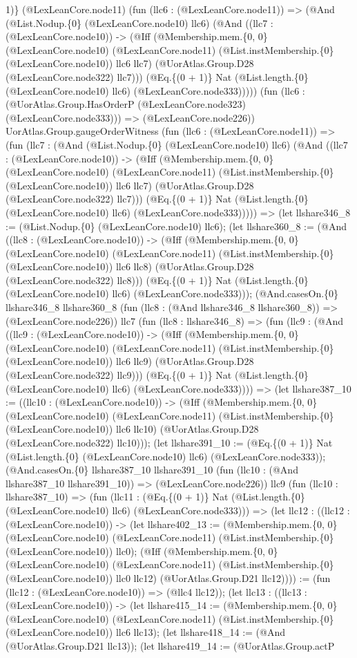 \documentclass[11pt]{article}
\begin{document}
1)\} (@LexLeanCore.node11) (fun (llc6 : (@LexLeanCore.node11)) => (@And (@List.Nodup.\{0\} (@LexLeanCore.node10) llc6) (@And ((llc7 : (@LexLeanCore.node10)) -> (@Iff (@Membership.mem.\{0, 0\} (@LexLeanCore.node10) (@LexLeanCore.node11) (@List.instMembership.\{0\} (@LexLeanCore.node10)) llc6 llc7) (@UorAtlas.Group.D28 (@LexLeanCore.node322) llc7))) (@Eq.\{(0 + 1)\} Nat (@List.length.\{0\} (@LexLeanCore.node10) llc6) (@LexLeanCore.node333))))) (fun (llc6 : (@UorAtlas.Group.HasOrderP (@LexLeanCore.node323) (@LexLeanCore.node333))) => (@LexLeanCore.node226)) UorAtlas.Group.gaugeOrderWitness (fun (llc6 : (@LexLeanCore.node11)) => (fun (llc7 : (@And (@List.Nodup.\{0\} (@LexLeanCore.node10) llc6) (@And ((llc7 : (@LexLeanCore.node10)) -> (@Iff (@Membership.mem.\{0, 0\} (@LexLeanCore.node10) (@LexLeanCore.node11) (@List.instMembership.\{0\} (@LexLeanCore.node10)) llc6 llc7) (@UorAtlas.Group.D28 (@LexLeanCore.node322) llc7))) (@Eq.\{(0 + 1)\} Nat (@List.length.\{0\} (@LexLeanCore.node10) llc6) (@LexLeanCore.node333))))) => (let llshare346\_8 := (@List.Nodup.\{0\} (@LexLeanCore.node10) llc6); (let llshare360\_8 := (@And ((llc8 : (@LexLeanCore.node10)) -> (@Iff (@Membership.mem.\{0, 0\} (@LexLeanCore.node10) (@LexLeanCore.node11) (@List.instMembership.\{0\} (@LexLeanCore.node10)) llc6 llc8) (@UorAtlas.Group.D28 (@LexLeanCore.node322) llc8))) (@Eq.\{(0 + 1)\} Nat (@List.length.\{0\} (@LexLeanCore.node10) llc6) (@LexLeanCore.node333))); (@And.casesOn.\{0\} llshare346\_8 llshare360\_8 (fun (llc8 : (@And llshare346\_8 llshare360\_8)) => (@LexLeanCore.node226)) llc7 (fun (llc8 : llshare346\_8) => (fun (llc9 : (@And ((llc9 : (@LexLeanCore.node10)) -> (@Iff (@Membership.mem.\{0, 0\} (@LexLeanCore.node10) (@LexLeanCore.node11) (@List.instMembership.\{0\} (@LexLeanCore.node10)) llc6 llc9) (@UorAtlas.Group.D28 (@LexLeanCore.node322) llc9))) (@Eq.\{(0 + 1)\} Nat (@List.length.\{0\} (@LexLeanCore.node10) llc6) (@LexLeanCore.node333)))) => (let llshare387\_10 := ((llc10 : (@LexLeanCore.node10)) -> (@Iff (@Membership.mem.\{0, 0\} (@LexLeanCore.node10) (@LexLeanCore.node11) (@List.instMembership.\{0\} (@LexLeanCore.node10)) llc6 llc10) (@UorAtlas.Group.D28 (@LexLeanCore.node322) llc10))); (let llshare391\_10 := (@Eq.\{(0 + 1)\} Nat (@List.length.\{0\} (@LexLeanCore.node10) llc6) (@LexLeanCore.node333)); (@And.casesOn.\{0\} llshare387\_10 llshare391\_10 (fun (llc10 : (@And llshare387\_10 llshare391\_10)) => (@LexLeanCore.node226)) llc9 (fun (llc10 : llshare387\_10) => (fun (llc11 : (@Eq.\{(0 + 1)\} Nat (@List.length.\{0\} (@LexLeanCore.node10) llc6) (@LexLeanCore.node333))) => (let llc12 : ((llc12 : (@LexLeanCore.node10)) -> (let llshare402\_13 := (@Membership.mem.\{0, 0\} (@LexLeanCore.node10) (@LexLeanCore.node11) (@List.instMembership.\{0\} (@LexLeanCore.node10)) llc0); (@Iff (@Membership.mem.\{0, 0\} (@LexLeanCore.node10) (@LexLeanCore.node11) (@List.instMembership.\{0\} (@LexLeanCore.node10)) llc0 llc12) (@UorAtlas.Group.D21 llc12)))) := (fun (llc12 : (@LexLeanCore.node10)) => (@llc4 llc12)); (let llc13 : ((llc13 : (@LexLeanCore.node10)) -> (let llshare415\_14 := (@Membership.mem.\{0, 0\} (@LexLeanCore.node10) (@LexLeanCore.node11) (@List.instMembership.\{0\} (@LexLeanCore.node10)) llc6 llc13); (let llshare418\_14 := (@And (@UorAtlas.Group.D21 llc13)); (let llshare419\_14 := (@UorAtlas.Group.actP 
\end{document}

